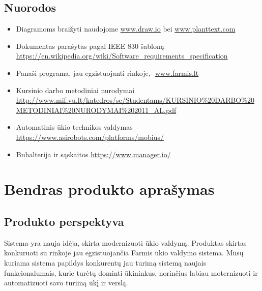 \documentclass[oneside]{VUMIFPSkursinis}
\begin{document}
\subsection{Nuorodos}
\begin{itemize}
	\item Diagramoms braižyti naudojome \url{www.draw.io} bei \url{www.planttext.com}
	\item Dokumentas parašytas pagal IEEE 830 šabloną \url{https://en.wikipedia.org/wiki/Software_requirements_specification}
	\item Panaši programa, jau egzistuojanti rinkoje,- \url{www.farmis.lt}
	\item Kursinio darbo metodiniai nurodymai \url{http://www.mif.vu.lt/katedros/se/Studentams/KURSINIO%20DARBO%20METODINIAI%20NURODYMAI%202011_AL.pdf}
	\item Automatinis ūkio technikos valdymas \url{https://www.asirobots.com/platforms/mobius/}
	\item Buhalterija ir sąskaitos \url{https://www.manager.io/}
\end{itemize}

\section{Bendras produkto aprašymas}
\subsection{Produkto perspektyva}
Sistema yra nauja idėja, skirta modernizuoti ūkio valdymą. Produktas skirtas konkuruoti su rinkoje jau egzistuojančia Farmis ūkio valdymo sistema. Mūsų kuriama sistema papildys konkurentų jau turimą sistemą naujais funkcionalumais, kurie turėtų dominti ūkininkus, norinčius labiau moternizuoti ir automatizuoti savo turimą ūkį ir verslą. 
\end{document}
